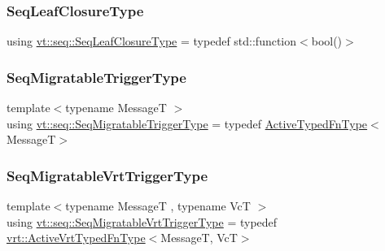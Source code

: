 \mbox{\label{namespacevt_1_1seq_a13c76fb1c62795dfd2d359b2dde35e8a}} 
\subsubsection{\texorpdfstring{Seq\+Leaf\+Closure\+Type}{SeqLeafClosureType}}
{\footnotesize\ttfamily using \hyperlink{namespacevt_1_1seq_a13c76fb1c62795dfd2d359b2dde35e8a}{vt\+::seq\+::\+Seq\+Leaf\+Closure\+Type} = typedef std\+::function$<$bool()$>$}

\mbox{\label{namespacevt_1_1seq_aab252d92ce46371ce1b307eeb524f030}} 
\subsubsection{\texorpdfstring{Seq\+Migratable\+Trigger\+Type}{SeqMigratableTriggerType}}
{\footnotesize\ttfamily template$<$typename MessageT $>$ \\
using \hyperlink{namespacevt_1_1seq_aab252d92ce46371ce1b307eeb524f030}{vt\+::seq\+::\+Seq\+Migratable\+Trigger\+Type} = typedef \hyperlink{namespacevt_a54eefd5373739c7365058b0d22fea6e2}{Active\+Typed\+Fn\+Type}$<$MessageT$>$}

\mbox{\label{namespacevt_1_1seq_a4147691d837ca54f178a5f1c49effc6f}} 
\subsubsection{\texorpdfstring{Seq\+Migratable\+Vrt\+Trigger\+Type}{SeqMigratableVrtTriggerType}}
{\footnotesize\ttfamily template$<$typename MessageT , typename VcT $>$ \\
using \hyperlink{namespacevt_1_1seq_a4147691d837ca54f178a5f1c49effc6f}{vt\+::seq\+::\+Seq\+Migratable\+Vrt\+Trigger\+Type} = typedef \hyperlink{namespacevt_1_1vrt_a14077459ea3367e5834151d314ff4bc8}{vrt\+::\+Active\+Vrt\+Typed\+Fn\+Type}$<$MessageT, VcT$>$}

